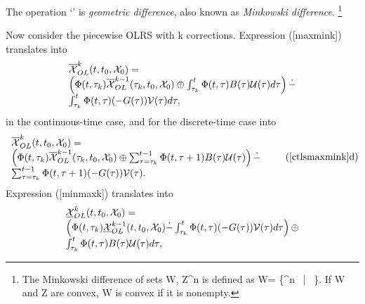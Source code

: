 \documentclass[letterpaper,10pt,english]{sphinxmanual}
\begin{document}
The operation ‘\dot{-}’ is \emph{geometric difference}, also known as
\emph{Minkowski difference}. \footnote{
The Minkowski difference of sets
{\mathcal W}, {\mathcal Z}^n is defined as
{\mathcal W}= \left\{\xi{}^n ~|~
\xi {}\right\}. If
{\mathcal W} and {\mathcal Z} are convex,
{\mathcal W} is convex if it is nonempty.
}

Now consider the piecewise OLRS with k corrections. Expression
({[}maxmink{]}) translates into
\begin{gather}
\begin{split}\begin{array}{l}
\overline{{\mathcal X}}_{OL}^k(t, t_0, {\mathcal X}_0) = \\
\left(\Phi(t, \tau_k)\overline{{\mathcal X}}_{OL}^{k-1}(\tau_k, t_0, {\mathcal X}_0) \oplus
\int_{\tau_k}^t\Phi(t, \tau)B(\tau){\mathcal U}(\tau)d\tau\right) \dot{-} \\
\int_{\tau_k}^t\Phi(t, \tau)(-G(\tau)){\mathcal V}(\tau)d\tau,
\end{array}
\label{ctlsmaxmink}\end{split}\notag
\end{gather}
in the continuous-time case, and for the discrete-time case into
\begin{gather}
\begin{split}\begin{array}{l}
\overline{{\mathcal X}}_{OL}^k(t, t_0, {\mathcal X}_0) = \\
\left(\Phi(t, \tau_k)\overline{{\mathcal X}}_{OL}^{k-1}(\tau_k, t_0, {\mathcal X}_0) \oplus
\sum_{\tau=\tau_k}^{t-1}\Phi(t, \tau+1)B(\tau){\mathcal U}(\tau)\right) \dot{-} \\
\sum_{\tau=\tau_k}^{t-1}\Phi(t, \tau+1)(-G(\tau)){\mathcal V}(\tau).
\end{array}
\tag*{(\ref{ctlsmaxmink}d)}
\label{dtlsmaxmink}\end{split}\notag
\end{gather}
Expression ({[}minmaxk{]}) translates into
\begin{gather}
\begin{split}\begin{array}{l}
\underline{{\mathcal X}}_{OL}^k(t, t_0, {\mathcal X}_0) = \\
\left(\Phi(t, \tau_k)\underline{{\mathcal X}}_{OL}^{k-1}(t, t_0, {\mathcal X}_0) \dot{-}
\int_{\tau_k}^t\Phi(t, \tau)(-G(\tau)){\mathcal V}(\tau)d\tau\right)
\oplus \\
\int_{\tau_k}^t\Phi(t, \tau)B(\tau){\mathcal U}(\tau)d\tau,
\end{array}
\label{ctlsminmaxk}\end{split}\notag
\end{gather}
\end{document}
